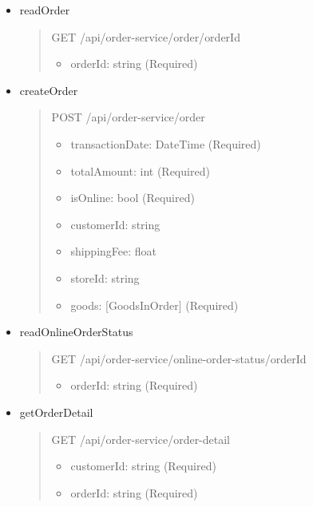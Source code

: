 \begin{itemize}
	\item readOrder
	\begin{quote}
		GET /api/order-service/order/{orderId}
		\begin{itemize}
			\item orderId: string (Required)
		\end{itemize}
	\end{quote}

	\item createOrder
	\begin{quote}
		POST /api/order-service/order
		\begin{itemize}
			\item transactionDate: DateTime (Required)
			\item totalAmount: int (Required)
			\item isOnline: bool (Required)
			\item customerId: string
			\item shippingFee: float
			\item storeId: string
			\item goods: [GoodsInOrder] (Required)
		\end{itemize}
	\end{quote}

	\item readOnlineOrderStatus
	\begin{quote}
		GET /api/order-service/online-order-status/{orderId}
		\begin{itemize}
			\item orderId: string (Required)
		\end{itemize}
	\end{quote}

	\item getOrderDetail
	\begin{quote}
		GET /api/order-service/order-detail
		\begin{itemize}
			\item customerId: string (Required)
			\item orderId: string (Required)
		\end{itemize}
	\end{quote}
\end{itemize}

